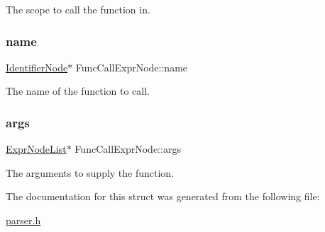The scope to call the function in. \mbox{\label{struct_func_call_expr_node_a2cee7d403ec240f220b3b428bba629ce}} 
\subsubsection{\texorpdfstring{name}{name}}
{\footnotesize\ttfamily \hyperlink{parser_8h_a930727769b8a8eb0d24d474f3aa12a43}{Identifier\+Node}$\ast$ Func\+Call\+Expr\+Node\+::name}

The name of the function to call. \mbox{\label{struct_func_call_expr_node_a559b2108d83b11b46584b85f6fd1b12b}} 
\subsubsection{\texorpdfstring{args}{args}}
{\footnotesize\ttfamily \hyperlink{struct_expr_node_list}{Expr\+Node\+List}$\ast$ Func\+Call\+Expr\+Node\+::args}

The arguments to supply the function. 

The documentation for this struct was generated from the following file\+:\begin{DoxyCompactItemize}
\item 
\hyperlink{parser_8h}{parser.\+h}\end{DoxyCompactItemize}
